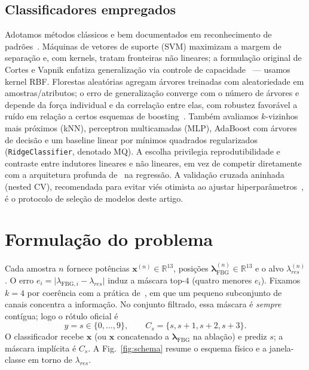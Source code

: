 \documentclass[conference]{IEEEtran}
\begin{document}
\subsection{Classificadores empregados}
Adotamos métodos clássicos e bem documentados em reconhecimento de padrões~\cite{Hastie2009ESL}.
Máquinas de vetores de suporte (SVM) maximizam a margem de separação e, com kernels, tratam fronteiras não lineares; a formulação original de Cortes e Vapnik enfatiza generalização via controle de capacidade~\cite{Cortes1995SVM} --- usamos kernel RBF.
Florestas aleatórias agregam árvores treinadas com aleatoriedade em amostras/atributos; o erro de generalização converge com o número de árvores e depende da força individual e da correlação entre elas, com robustez favorável a ruído em relação a certos esquemas de boosting~\cite{Breiman2001RF}.
Também avaliamos $k$-vizinhos mais próximos (kNN), perceptron multicamadas (MLP), AdaBoost com árvores de decisão e um baseline linear por mínimos quadrados regularizados (\texttt{RidgeClassifier}, denotado MQ).
A escolha privilegia reprodutibilidade e contraste entre indutores lineares e não lineares, em vez de competir diretamente com a arquitetura profunda de~\cite{Barino2025TIM} na regressão.
A validação cruzada aninhada (nested CV), recomendada para evitar viés otimista ao ajustar hiperparâmetros~\cite{Hastie2009ESL}, é o protocolo de seleção de modelos deste artigo.

\section{Formulação do problema}

Cada amostra $n$ fornece potências $\mathbf{x}^{(n)}\in\mathbb{R}^{13}$, posições $\boldsymbol{\lambda}_{\mathrm{FBG}}^{(n)}\in\mathbb{R}^{13}$ e o alvo $\lambda_{res}^{(n)}$.
O erro $e_i=\lvert\lambda_{\mathrm{FBG},i}-\lambda_{res}\rvert$ induz a máscara top-$4$ (quatro menores $e_i$).
Fixamos $k=4$ por coerência com a prática de~\cite{Barino2025TIM}, em que um pequeno subconjunto de canais concentra a informação.
No conjunto filtrado, essa máscara é \emph{sempre} contígua; logo o rótulo oficial é
\begin{equation}
y = s \in \{0,\ldots,9\}, \qquad C_s=\{s,s+1,s+2,s+3\}.
\end{equation}
O classificador recebe $\mathbf{x}$ (ou $\mathbf{x}$ concatenado a $\boldsymbol{\lambda}_{\mathrm{FBG}}$ na ablação) e prediz $s$; a máscara implícita é $C_s$.
A Fig.~\ref{fig:schema} resume o esquema físico e a janela-classe em torno de $\lambda_{res}$.
\end{document}
